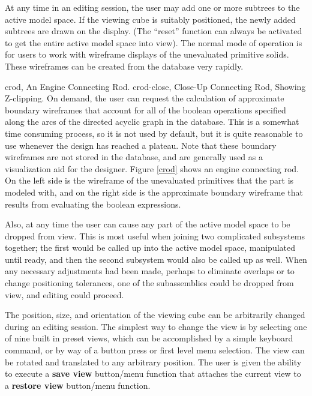 At any time in an editing session, the user may add one or more
subtrees to the active model space.  If the viewing cube is
suitably positioned, the newly added subtrees are drawn on the display.
(The ``reset'' function can always be activated to get the entire active
model space into view).
The normal mode of operation is for users to work with wireframe
displays of the unevaluated primitive solids.  These wireframes can be
created from the database very rapidly.

\mfig crod, An Engine Connecting Rod.
\mfig crod-close, {Close-Up Connecting Rod, Showing Z-clipping}.
On demand, the user can request the calculation of
approximate boundary wireframes that account for
all of the boolean operations specified along the arcs of the
directed acyclic graph in the database.
This is a somewhat time consuming process, so it is not used
by default, but it is quite reasonable to use whenever the
design has reached a plateau.
Note that these boundary wireframes are not stored in the database,
and are generally used as a visualization aid for the designer.
Figure \ref{crod} shows an engine connecting rod.
On the left side is the wireframe of the unevaluated primitives
that the part is modeled with, and on the right side is the approximate
boundary wireframe that results from evaluating the boolean expressions.

Also, at any time the user can cause any part of the active model space
to be dropped from view.
This is most useful when joining two complicated subsystems
together;  the first would be called up into the active model space,
manipulated until ready, and then the second subsystem would also be
called up as well.  When any necessary adjustments had been made,
perhaps to eliminate overlaps or to change positioning tolerances,
one of the subassemblies could be dropped from view,
and editing could proceed.

The position, size, and orientation of the viewing cube can be
arbitrarily changed during an editing session.
The simplest way to change the view is by selecting one of nine
built in preset views, which can be accomplished by a simple keyboard
command, or by way of a button press or first level menu selection.
The view can be rotated and translated to any arbitrary position.
The user is given the ability to execute a {\bf save view} button/menu
function that attaches the current view to a {\bf restore view} button/menu
function.

